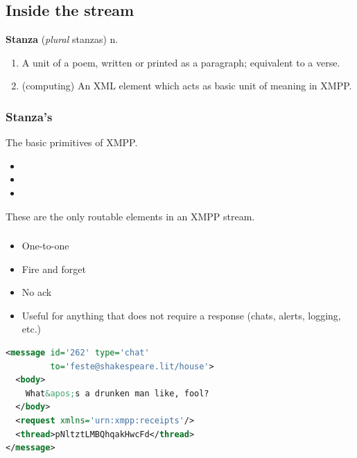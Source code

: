 \documentclass[xelatex,aspectratio=169]{beamer}
\begin{document}

\subsection[]{Inside the stream}
\begin{frame}
\subsectionpage
\end{frame}

\begin{frame}
\vspace*{\fill}
\textbf{Stanza}  (\kern1pt\textit{plural} stanzas) n.
\begin{enumerate}
	\item A unit of a poem, written or printed as a paragraph; equivalent to a verse.
	\item (computing) An XML element which acts as basic unit of meaning in XMPP.
\end{enumerate}
\vspace*{\fill}
\end{frame}

\begin{frame}
	\frametitle{Stanza's}
	The basic primitives of XMPP.
	\begin{itemize}
		\item {}
		\item {}
		\item {}
	\end{itemize}

	These are the only routable elements in an XMPP stream.
\end{frame}

\begin{frame}[fragile]
	\frametitle{}
	\begin{itemize}
	\item One-to-one
	\item Fire and forget
	\item No ack
	\item Useful for anything that does not require a response (chats, alerts,
		logging, etc.)
	\end{itemize}
	\begin{lstlisting}[frame=single,language=xml]
<message id='262' type='chat'
         to='feste@shakespeare.lit/house'>
  <body>
    What&apos;s a drunken man like, fool?
  </body>
  <request xmlns='urn:xmpp:receipts'/>
  <thread>pNltztLMBQhqakHwcFd</thread>
</message>
\end{lstlisting}
\end{frame}
\end{document}
